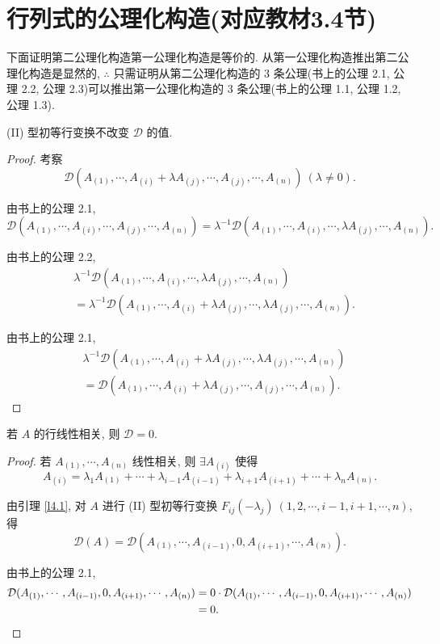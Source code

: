 \documentclass[color=black,device=normal,lang=cn,mode=geye]{elegantnote}
\begin{document}
\section{行列式的公理化构造(对应教材3.4节)}
下面证明第二公理化构造第一公理化构造是等价的. 从第一公理化构造推出第二公理化构造是显然的, $\therefore$ 只需证明从第二公理化构造的 3 条公理(书上的公理 2.1, 公理 2.2, 公理 2.3)可以推出第一公理化构造的 3 条公理(书上的公理 1.1, 公理 1.2, 公理 1.3).
\begin{lemma}\label{l4.1}
    (II) 型初等行变换不改变 $\mathcal{D}$ 的值.
\end{lemma}
\begin{proof}
    考察
    \[\mathcal{D}(A_{(1)},\cdots,A_{(i)}+\lambda A_{(j)},\cdots,A_{(j)},\cdots,A_{(n)})\ (\lambda\neq0).\]

    由书上的公理 2.1,
    \[\mathcal{D}(A_{(1)},\cdots,A_{(i)},\cdots,A_{(j)},\cdots,A_{(n)})=\lambda^{-1}\mathcal{D}(A_{(1)},\cdots,A_{(i)},\cdots,\lambda A_{(j)},\cdots,A_{(n)}).\]

    由书上的公理 2.2,
    \begin{align*}
        & \lambda^{-1}\mathcal{D}(A_{(1)},\cdots,A_{(i)},\cdots,\lambda A_{(j)},\cdots,A_{(n)}) \\
        & =\lambda^{-1}\mathcal{D}(A_{(1)},\cdots,A_{(i)}+\lambda A_{(j)},\cdots,\lambda A_{(j)},\cdots,A_{(n)}).
    \end{align*}

    由书上的公理 2.1,
    \begin{align*}
        & \lambda^{-1}\mathcal{D}(A_{(1)},\cdots,A_{(i)}+\lambda A_{(j)},\cdots,\lambda A_{(j)},\cdots,A_{(n)}) \\
        & =\mathcal{D}(A_{(1)},\cdots,A_{(i)}+\lambda A_{(j)},\cdots,A_{(j)},\cdots,A_{(n)}).
    \end{align*}
\end{proof}
\begin{lemma}\label{l4.2}
    若 $A$ 的行线性相关, 则 $\mathcal{D}=0$.
\end{lemma}
\begin{proof}
    若 $A_{(1)},\cdots,A_{(n)}$ 线性相关, 则 $\exists A_{(i)}$ 使得
    \[A_{(i)}=\lambda_1A_{(1)}+\cdots+\lambda_{i-1}A_{(i-1)}+\lambda_{i+1}A_{(i+1)}+\cdots+\lambda_nA_{(n)}.\]

    由引理 \ref{l4.1}, 对 $A$ 进行 (II) 型初等行变换 $F_{ij}(-\lambda_j)\ (1,2,\cdots,i-1,i+1,\cdots,n)$, 得
    \[\mathcal{D}(A)=\mathcal{D}(A_{(1)},\cdots,A_{(i-1)},0,A_{(i+1)},\cdots,A_{(n)}).\]

    由书上的公理 2.1,
    \begin{align*}
        \mathcal{D}(A_{(1)},\cdots,A_{(i-1)},0,A_{(i+1)},\cdots,A_{(n)}) & =0\cdot\mathcal{D}(A_{(1)},\cdots,A_{(i-1)},0,A_{(i+1)},\cdots,A_{(n)}) \\
        & =0.\qedhere
    \end{align*}
\end{proof}
\end{document}
